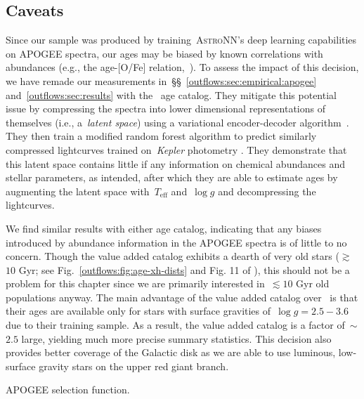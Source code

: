 \subsection{Caveats}
\label{outflows:sec:empirical:caveats}
Since our sample was produced by training~\textsc{AstroNN}'s deep learning
capabilities on APOGEE spectra, our ages may be biased by known correlations
with abundances (e.g., the age-[O/Fe] relation,~\citealt{Feuillet2019}).
To assess the impact of this decision, we have remade our measurements
in~\S\S~\ref{outflows:sec:empirical:apogee} and~\ref{outflows:sec:results}
with the~\citet{Leung2023} age catalog.
They mitigate this potential issue by compressing the spectra into lower
dimensional representations of themselves (i.e., a~\textit{latent space}) using
a variational encoder-decoder algorithm~\citep[e.g.,][]{LeCun2015}.
They then train a modified random forest algorithm to predict similarly
compressed lightcurves trained on~\textit{Kepler} photometry
\citep{Borucki2010}.
They demonstrate that this latent space contains little if any information on
chemical abundances and stellar parameters, as intended, after which they are
able to estimate ages by augmenting the latent space with~$T_\text{eff}$
and~$\log g$ and decompressing the lightcurves.
\par
We find similar results with either age catalog, indicating that any biases
introduced by abundance information in the APOGEE spectra is of little to no
concern.
Though the value added catalog exhibits a dearth of very old stars
($\gtrsim$$10$ Gyr; see Fig.~\ref{outflows:fig:age-xh-dists} and Fig. 11 of
\citealt{Leung2023}), this should not be a problem for this chapter since we
are primarily interested in~$\lesssim$$10$ Gyr old populations anyway.
The main advantage of the value added catalog over~\citet{Leung2023} is that
their ages are available only for stars with surface gravities
of~$\log g = 2.5 - 3.6$ due to their training sample.
As a result, the value added catalog is a factor of~$\sim$$2.5$ large, yielding
much more precise summary statistics.
This decision also provides better coverage of the Galactic disk as we are able
to use luminous, low-surface gravity stars on the upper red giant branch.
\par
{\color{red} APOGEE selection function.}


